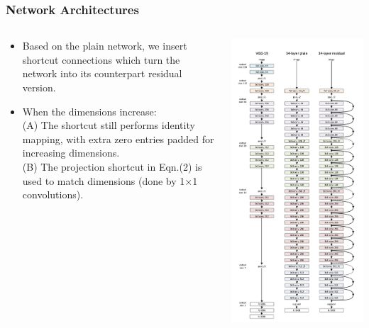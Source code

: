 \documentclass[
	11pt, %
]{beamer}
\begin{document}
\begin{frame}
	\frametitle{Network Architectures}
	
	\begin{columns}
		\begin{column}{0.5\textwidth}
			\begin{itemize}
				\item Based on the plain network, we insert shortcut connections which turn the network into its counterpart residual version.
				\item When the dimensions increase: 
				\\(A) The shortcut still performs identity mapping, with extra zero entries padded for increasing dimensions.
				\\(B) The projection shortcut in Eqn.(2) is used to match dimensions (done by 1×1 convolutions).
			\end{itemize}
		\end{column}
		\begin{column}{0.6\textwidth}
			\centering
			\includegraphics[width=0.5\linewidth]{./images/Screenshot 2025-05-20 at 0.25.50.png} %
		\end{column}
	\end{columns}
\end{frame}
\end{document}
